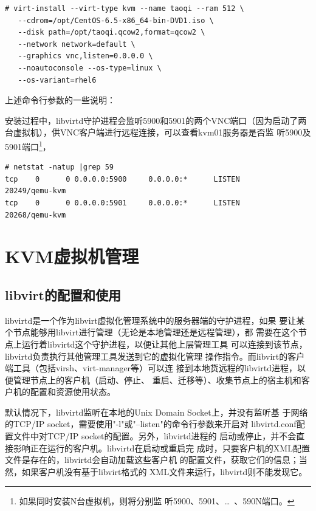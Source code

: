 \begin{verbatim}
# virt-install --virt-type kvm --name taoqi --ram 512 \
   --cdrom=/opt/CentOS-6.5-x86_64-bin-DVD1.iso \
   --disk path=/opt/taoqi.qcow2,format=qcow2 \
   --network network=default \
   --graphics vnc,listen=0.0.0.0 \
   --noautoconsole --os-type=linux \
   --os-variant=rhel6
\end{verbatim}

上述命令行参数的一些说明：

安装过程中，libvirtd守护进程会监听5900和5901的两个VNC端口（因为启动了两
台虚拟机），供VNC客户端进行远程连接，可以查看kvm01服务器是否监
听5900及5901端口\footnote{如果同时安装N台虚拟机，则将分别监
  听5900、5901、\dots\ 、590N端口。}，

\begin{verbatim}
# netstat -natup |grep 59
tcp    0      0 0.0.0.0:5900     0.0.0.0:*      LISTEN      20249/qemu-kvm      
tcp    0      0 0.0.0.0:5901     0.0.0.0:*      LISTEN      20268/qemu-kvm
\end{verbatim}

\section{KVM虚拟机管理}
\label{sec:manageKVM}

\subsection{libvirt的配置和使用}
\label{sec:configLibvirt}

libvirtd是一个作为libvirt虚拟化管理系统中的服务器端的守护进程，如果
要让某个节点能够用libvirt进行管理（无论是本地管理还是远程管理），都
需要在这个节点上运行着libvirtd这个守护进程，以便让其他上层管理工具
可以连接到该节点，libvirtd负责执行其他管理工具发送到它的虚拟化管理
操作指令。而libvirt的客户端工具（包括virsh、virt-manager等）可以连
接到本地货远程的libvirtd进程，以便管理节点上的客户机（启动、停止、
重启、迁移等）、收集节点上的宿主机和客户机的配置和资源使用状态。

默认情况下，libvirtd监听在本地的Unix Domain Socket上，并没有监听基
于网络的TCP/IP socket，需要使用"-l"或"--listen"的命令行参数来开启对
libvirtd.conf配置文件中对TCP/IP socket的配置。另外，libvirtd进程的
启动或停止，并不会直接影响正在运行的客户机。libvirtd在启动或重启完
成时，只要客户机的XML配置文件是存在的，libvirtd会自动加载这些客户机
的配置文件，获取它们的信息；当然，如果客户机没有基于libvirt格式的
XML文件来运行，libvirtd则不能发现它。

